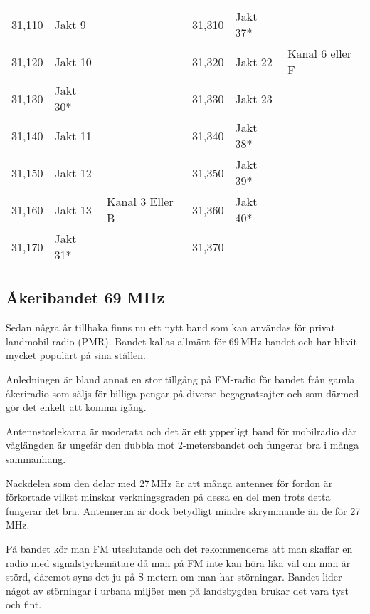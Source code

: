 \begin{longtable}{rll|rll}
	           31,110 & Jakt 9             &                   &   31,310          &   Jakt 37*         &                   \\
	           31,120 & Jakt 10            &                   &   31,320          &   Jakt 22          & Kanal 6 eller F   \\
	           31,130 & Jakt 30*           &                   &   31,330          &   Jakt 23          &                   \\
	           31,140 & Jakt 11            &                   &   31,340          &   Jakt 38*         &                   \\
	           31,150 & Jakt 12            &                   &   31,350          &   Jakt 39*        &                   \\
	           31,160 & Jakt 13            & Kanal 3 Eller B   &   31,360          &   Jakt 40*         &                   \\
	           31,170 & Jakt 31*           &                   &   31,370          &                    &
\end{longtable}

\subsection{Åkeribandet 69 MHz}

Sedan några år tillbaka finns nu ett nytt band som kan användas för privat
landmobil radio (PMR). Bandet kallas allmänt för 69\,MHz-bandet och har blivit
mycket populärt på sina ställen.

Anledningen är bland annat en stor tillgång på FM-radio för bandet från gamla
åkeriradio som säljs för billiga pengar på diverse begagnatsajter och som
därmed gör det enkelt att komma igång.

Antennstorlekarna är moderata och det är ett ypperligt band för mobilradio där
våglängden är ungefär den dubbla mot 2-metersbandet och fungerar bra i många
sammanhang.

Nackdelen som den delar med 27\,MHz är att många antenner för fordon är
förkortade vilket minskar verkningsgraden på dessa en del men trots detta
fungerar det bra. Antennerna är dock betydligt mindre skrymmande än de för
27\,MHz.

På bandet kör man FM uteslutande och det rekommenderas att man skaffar en
radio med signalstyrkemätare då man på FM inte kan höra lika väl om man är
störd, däremot syns det ju på S-metern om man har störningar. Bandet lider
något av störningar i urbana miljöer men på landsbygden brukar det vara tyst
och fint.

